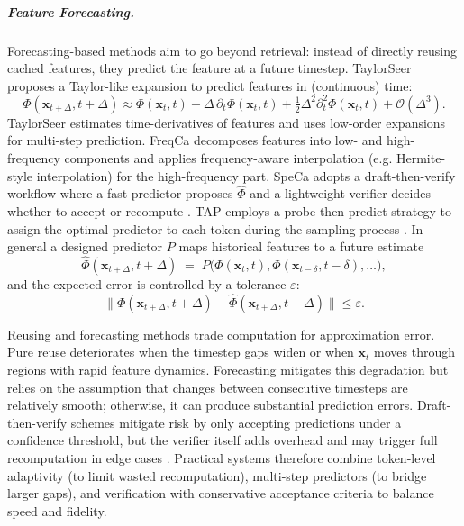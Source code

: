 \subparagraph{Feature Forecasting.}
Forecasting-based methods aim to go beyond retrieval: instead of directly reusing cached features, they predict the feature at a future timestep. TaylorSeer proposes a Taylor-like expansion to predict features in (continuous) time:
\begin{equation}
\Phi(\mathbf{x}_{t+\Delta},t+\Delta) \approx \Phi(\mathbf{x}_t,t) + \Delta\,\partial_t\Phi(\mathbf{x}_t,t) + \tfrac{1}{2}\Delta^2\partial_t^2\Phi(\mathbf{x}_t,t) + \mathcal{O}(\Delta^3).
\label{eq:taylor}
\end{equation}
TaylorSeer estimates time-derivatives of features and uses low-order expansions for multi-step prediction.
FreqCa decomposes features into low- and high-frequency components and applies frequency-aware interpolation (e.g. Hermite-style interpolation) for the high-frequency part. SpeCa adopts a draft-then-verify workflow where a fast predictor proposes \(\hat{\Phi}\) and a lightweight verifier decides whether to accept or recompute \citep{liuReusingForecastingAccelerating2025,liu2025freqca,liu2025speca}. TAP employs a probe-then-predict strategy to assign the optimal predictor to each token during the sampling process \citep{zhu2026tap}.
In general a designed predictor \(P\) maps historical features to a future estimate
\begin{equation}
\hat{\Phi}(\mathbf{x}_{t+\Delta},t+\Delta) \;=\; P\big(\Phi(\mathbf{x}_{t},t), \Phi(\mathbf{x}_{t-\delta},t-\delta),\dots\big),
\label{eq:predictor}
\end{equation}
and the expected error is controlled by a tolerance \(\varepsilon\):
\[
\big\|\Phi(\mathbf{x}_{t+\Delta},t+\Delta) - \hat{\Phi}(\mathbf{x}_{t+\Delta},t+\Delta)\big\| \le \varepsilon.
\]

Reusing and forecasting methods trade computation for approximation error. Pure reuse deteriorates when the timestep gaps widen or when \(\mathbf{x}_t\) moves through regions with rapid feature dynamics. Forecasting mitigates this degradation but relies on the assumption that changes between consecutive timesteps are relatively smooth; otherwise, it can produce substantial prediction errors.
Draft-then-verify schemes mitigate risk by only accepting predictions under a confidence threshold, but the verifier itself adds overhead and may trigger full recomputation in edge cases \citep{liu2024timestep,chen2024delta-dit}. 
Practical systems therefore combine token-level adaptivity (to limit wasted recomputation), multi-step predictors (to bridge larger gaps), and verification with conservative acceptance criteria to balance speed and fidelity.

